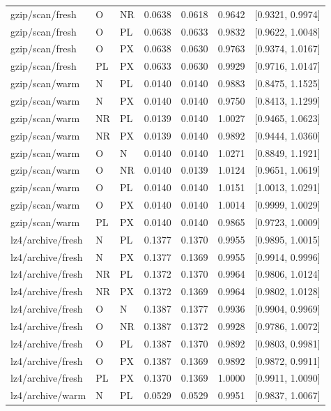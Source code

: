 \begin{longtable}{lllrrrr}
gzip/scan/fresh & O & NR & 0.0638 & 0.0618 & 0.9642 & [0.9321, 0.9974] \\
gzip/scan/fresh & O & PL & 0.0638 & 0.0633 & 0.9832 & [0.9622, 1.0048] \\
gzip/scan/fresh & O & PX & 0.0638 & 0.0630 & 0.9763 & [0.9374, 1.0167] \\
gzip/scan/fresh & PL & PX & 0.0633 & 0.0630 & 0.9929 & [0.9716, 1.0147] \\
gzip/scan/warm & N & PL & 0.0140 & 0.0140 & 0.9883 & [0.8475, 1.1525] \\
gzip/scan/warm & N & PX & 0.0140 & 0.0140 & 0.9750 & [0.8413, 1.1299] \\
gzip/scan/warm & NR & PL & 0.0139 & 0.0140 & 1.0027 & [0.9465, 1.0623] \\
gzip/scan/warm & NR & PX & 0.0139 & 0.0140 & 0.9892 & [0.9444, 1.0360] \\
gzip/scan/warm & O & N & 0.0140 & 0.0140 & 1.0271 & [0.8849, 1.1921] \\
gzip/scan/warm & O & NR & 0.0140 & 0.0139 & 1.0124 & [0.9651, 1.0619] \\
gzip/scan/warm & O & PL & 0.0140 & 0.0140 & 1.0151 & [1.0013, 1.0291] \\
gzip/scan/warm & O & PX & 0.0140 & 0.0140 & 1.0014 & [0.9999, 1.0029] \\
gzip/scan/warm & PL & PX & 0.0140 & 0.0140 & 0.9865 & [0.9723, 1.0009] \\
lz4/archive/fresh & N & PL & 0.1377 & 0.1370 & 0.9955 & [0.9895, 1.0015] \\
lz4/archive/fresh & N & PX & 0.1377 & 0.1369 & 0.9955 & [0.9914, 0.9996] \\
lz4/archive/fresh & NR & PL & 0.1372 & 0.1370 & 0.9964 & [0.9806, 1.0124] \\
lz4/archive/fresh & NR & PX & 0.1372 & 0.1369 & 0.9964 & [0.9802, 1.0128] \\
lz4/archive/fresh & O & N & 0.1387 & 0.1377 & 0.9936 & [0.9904, 0.9969] \\
lz4/archive/fresh & O & NR & 0.1387 & 0.1372 & 0.9928 & [0.9786, 1.0072] \\
lz4/archive/fresh & O & PL & 0.1387 & 0.1370 & 0.9892 & [0.9803, 0.9981] \\
lz4/archive/fresh & O & PX & 0.1387 & 0.1369 & 0.9892 & [0.9872, 0.9911] \\
lz4/archive/fresh & PL & PX & 0.1370 & 0.1369 & 1.0000 & [0.9911, 1.0090] \\
lz4/archive/warm & N & PL & 0.0529 & 0.0529 & 0.9951 & [0.9837, 1.0067] \\

\end{longtable}
